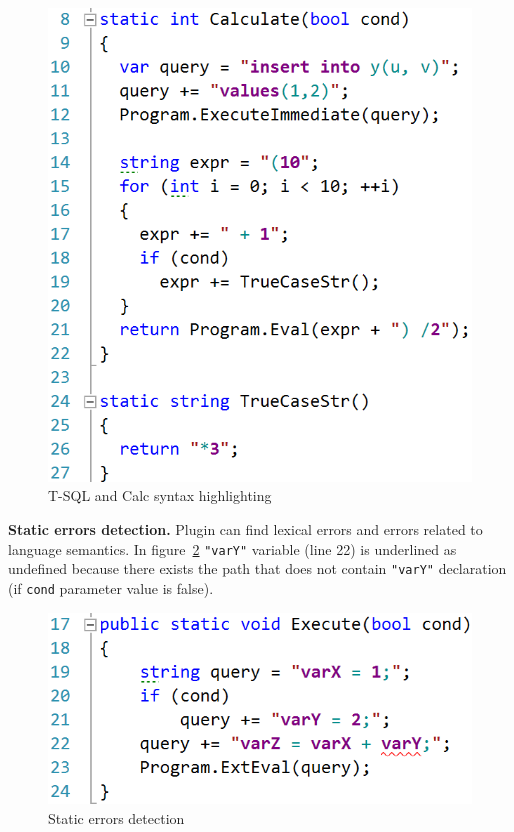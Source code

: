 \begin{figure}[h!]
    \begin{center}
        \includegraphics[scale=0.4]{Figures/sql_and_calc_cycle.PNG}
    \end{center}
    \caption{T-SQL and Calc syntax highlighting}
    \label{highlighting}
\end{figure}

\textbf{Static errors detection.} Plugin can find lexical errors and errors related to language semantics. In figure~\ref{static_error} \verb|"varY"| variable (line 22) is underlined as undefined because there exists the path that does not contain \verb|"varY"| declaration (if \verb|cond| parameter value is false).

\begin{figure}[h!]
    \begin{center}
        \includegraphics[scale=0.4]{Figures/Undefined_variable.PNG}
    \end{center}
    \caption{Static errors detection}
    \label{static_error}
\end{figure}

